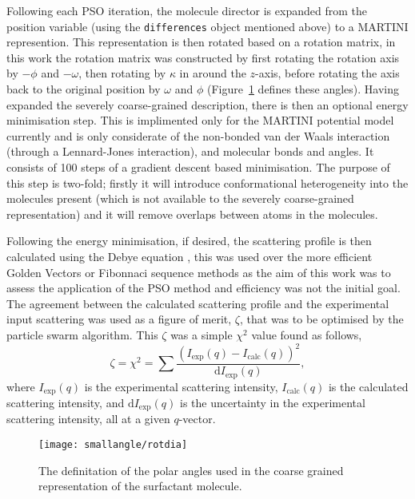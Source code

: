 Following each PSO iteration, the molecule director is expanded from the position variable (using the \texttt{differences} object mentioned above) to a MARTINI represention.
This representation is then rotated based on a rotation matrix, in this work the rotation matrix was constructed by first rotating the rotation axis by $-\phi$ and $-\omega$, then rotating by $\kappa$ in around the $z$-axis, before rotating the axis back to the original position by $\omega$ and $\phi$ \cite{evans_rotations_2001} (Figure~\ref{fig:rot} defines these angles).
Having expanded the severely coarse-grained description, there is then an optional energy minimisation step.
This is implimented only for the MARTINI potential model currently and is only considerate of the non-bonded van der Waals interaction (through a Lennard-Jones interaction), and molecular bonds and angles.
It consists of 100 steps of a gradient descent based minimisation.
The purpose of this step is two-fold; firstly it will introduce conformational heterogeneity into the molecules present (which is not available to the severely coarse-grained representation) and it will remove overlaps between atoms in the molecules.


Following the energy minimisation, if desired, the scattering profile is then calculated using the Debye equation \cite{debye_zerstreuung_1915}, this was used over the more efficient Golden Vectors \cite{watson_rapid_2013} or Fibonnaci sequence \cite{svergun_solution_1994} methods as the aim of this work was to assess the application of the PSO method and efficiency was not the initial goal.
The agreement between the calculated scattering profile and the experimental input scattering was used as a figure of merit, $\zeta$, that was to be optimised by the particle swarm algorithm.
This $\zeta$ was a simple $\chi^2$ value found as follows,
%
\begin{equation}
\zeta = \chi^2 = \sum\frac{(I_{\text{exp}}(q) - I_{\text{calc}}(q))^2}{\text{d}I_{\text{exp}}(q)},
\end{equation}
%
where $I_{\text{exp}}(q)$ is the experimental scattering intensity, $I_{\text{calc}}(q)$ is the calculated scattering intensity, and $\text{d}I_{\text{exp}}(q)$ is the uncertainty in the experimental scattering intensity, all at a given $q$-vector.
%
\begin{figure}
    \centering
    \texttt{[image: smallangle/rotdia]}
    \caption{The definitation of the polar angles used in the coarse grained representation of the surfactant molecule.}
    \label{fig:rot}
\end{figure}
%


